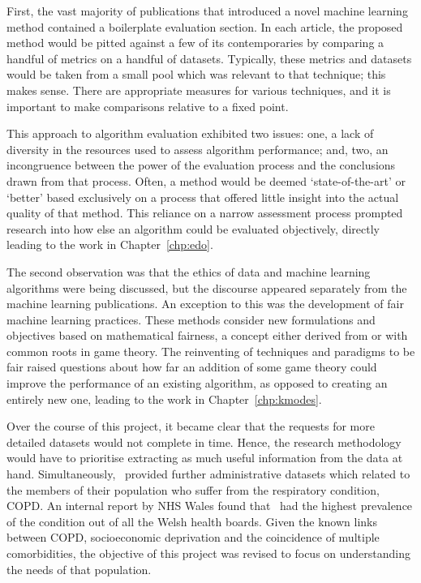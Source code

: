 First, the vast majority of publications that introduced a novel machine
learning method contained a boilerplate evaluation section. In each article, the
proposed method would be pitted against a few of its contemporaries by comparing
a handful of metrics on a handful of datasets. Typically, these metrics and
datasets would be taken from a small pool which was relevant to that technique;
this makes sense. There are appropriate measures for various techniques, and it
is important to make comparisons relative to a fixed point.

This approach to algorithm evaluation exhibited two issues: one, a lack
of diversity in the resources used to assess algorithm performance; and, two, an
incongruence between the power of the evaluation process and the conclusions
drawn from that process. Often, a method would be deemed `state-of-the-art' or
`better' based exclusively on a process that offered little insight into the
actual quality of that method. This reliance on a narrow assessment process
prompted research into how else an algorithm could be evaluated objectively,
directly leading to the work in Chapter~\ref{chp:edo}.

The second observation was that the ethics of data and machine learning
algorithms were being discussed, but the discourse appeared separately from the
machine learning publications. An exception to this was the development of fair
machine learning practices. These methods consider new formulations and
objectives based on mathematical fairness, a concept either derived from or with
common roots in game theory. The reinventing of techniques and paradigms to be
fair raised questions about how far an addition of some game theory could
improve the performance of an existing algorithm, as opposed to creating an
entirely new one, leading to the work in Chapter~\ref{chp:kmodes}.

Over the course of this project, it became clear that the requests for more
detailed datasets would not complete in time. Hence, the research methodology
would have to prioritise extracting as much useful information from the data at
hand. Simultaneously, \ctmuhb\ provided further administrative datasets which
related to the members of their population who suffer from the respiratory
condition, COPD. An internal report by NHS Wales found that \ctmuhb\ had the
highest prevalence of the condition out of all the Welsh health boards. Given
the known links between COPD, socioeconomic deprivation and the coincidence of
multiple comorbidities, the objective of this project was revised to focus on
understanding the needs of that population.

